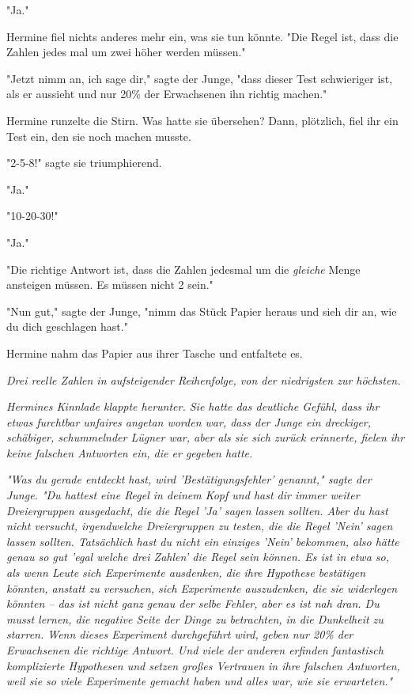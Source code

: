 {"Ja."

Hermine fiel nichts anderes mehr ein, was sie tun könnte. "Die Regel ist, dass die Zahlen jedes mal um zwei höher werden müssen."

"Jetzt nimm an, ich sage dir," sagte der Junge, "dass dieser Test schwieriger ist, als er aussieht und nur 20\% der Erwachsenen ihn richtig machen."

Hermine runzelte die Stirn. Was hatte sie übersehen? Dann, plötzlich, fiel ihr ein Test ein, den sie noch machen musste.

"2-5-8!" sagte sie triumphierend.

"Ja."

"10-20-30!"

"Ja."

"Die richtige Antwort ist, dass die Zahlen jedesmal um die \emph{gleiche} Menge ansteigen müssen. Es müssen nicht 2 sein."

"Nun gut," sagte der Junge, "nimm das Stück Papier heraus und sieh dir an, wie du dich geschlagen hast."

Hermine nahm das Papier aus ihrer Tasche und entfaltete es.

\emph{Drei reelle Zahlen in aufsteigender Reihenfolge, von der niedrigsten zur höchsten.}

\emph{Hermines Kinnlade klappte herunter. Sie hatte das deutliche Gefühl, dass ihr etwas furchtbar unfaires angetan worden war, dass der Junge ein dreckiger, schäbiger, schummelnder Lügner war, aber als sie sich zurück erinnerte, fielen ihr keine falschen Antworten ein, die er gegeben hatte.}

\emph{"Was du gerade entdeckt hast, wird 'Bestätigungsfehler' genannt," sagte der Junge. "Du hattest eine Regel in deinem Kopf und hast dir immer weiter Dreiergruppen ausgedacht, die die Regel 'Ja' sagen lassen sollten. Aber du hast nicht versucht, irgendwelche Dreiergruppen zu testen, die die Regel 'Nein' sagen lassen sollten. Tatsächlich hast du nicht ein} \emph{\emph{einziges}} \emph{'Nein' bekommen, also hätte genau so gut 'egal welche drei Zahlen' die Regel sein können. Es ist in etwa so, als wenn Leute sich Experimente ausdenken, die ihre Hypothese bestätigen könnten, anstatt zu versuchen, sich Experimente auszudenken, die sie widerlegen könnten -- das ist nicht ganz genau der selbe Fehler, aber es ist nah dran. Du musst lernen, die negative Seite der Dinge zu betrachten, in die Dunkelheit zu starren. Wenn dieses Experiment durchgeführt wird, geben nur 20\% der Erwachsenen die richtige Antwort. Und viele der anderen erfinden fantastisch komplizierte Hypothesen und setzen großes Vertrauen in ihre falschen Antworten, weil sie so viele Experimente gemacht haben und alles war, wie sie erwarteten."}

}
